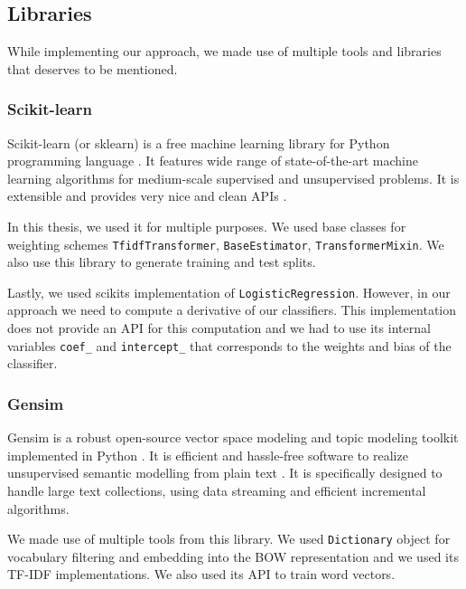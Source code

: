     \subsection{Libraries} 

    While implementing our approach, we made use of multiple tools and libraries that deserves to be mentioned.

    \subsubsection{Scikit-learn}
    
    Scikit-learn (or sklearn) is a free machine learning library for Python programming language \cite{scikit-learn}.
    It features wide range of state-of-the-art machine learning algorithms for medium-scale supervised and unsupervised problems.
    It is extensible and provides very nice and clean APIs \cite{sklearn_api}.
    
    In this thesis, we used it for multiple purposes.
    We used base classes for weighting schemes \texttt{TfidfTransformer}, \texttt{BaseEstimator}, \texttt{TransformerMixin}.
    We also use this library to generate training and test splits. 
    
    Lastly, we used scikits implementation of \texttt{LogisticRegression}.
    However, in our approach we need to compute a derivative of our classifiers. 
    This implementation does not provide an API for this computation and we had to use
    its internal variables \texttt{coef\_} and \texttt{intercept\_} that corresponds to the weights and bias of the classifier.
    
    \subsubsection{Gensim}
    
    Gensim is a robust open-source vector space modeling and topic modeling toolkit implemented in Python \cite{rehurek_lrec}. 
    It is efficient and hassle-free software to realize unsupervised semantic modelling from plain text \cite{bird2009natural}. %
    It is specifically designed to handle large text collections, using data streaming and efficient incremental algorithms. 
    
    We made use of multiple tools from this library. 
    We used \texttt{Dictionary} object for vocabulary filtering and embedding into the BOW representation and we used its TF-IDF implementations.
    We also used its API to train word vectors. 
    
